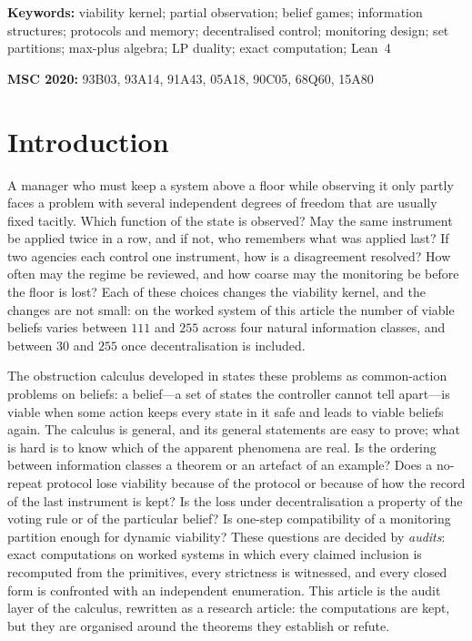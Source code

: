 \documentclass[11pt,a4paper]{article}
\theoremstyle{plain}
\theoremstyle{definition}
\theoremstyle{remark}
\begin{document}
\medskip
\noindent\textbf{Keywords:} viability kernel; partial observation; belief games; information structures; protocols and memory; decentralised control; monitoring design; set partitions; max-plus algebra; LP duality; exact computation; Lean~4

\medskip
\noindent\textbf{MSC 2020:} 93B03, 93A14, 91A43, 05A18, 90C05, 68Q60, 15A80
\section{Introduction}\label{sec:intro}

A manager who must keep a system above a floor while observing it only partly faces a problem with several independent degrees of freedom that are usually fixed tacitly. Which function of the state is observed? May the same instrument be applied twice in a row, and if not, who remembers what was applied last? If two agencies each control one instrument, how is a disagreement resolved? How often may the regime be reviewed, and how coarse may the monitoring be before the floor is lost? Each of these choices changes the viability kernel, and the changes are not small: on the worked system of this article the number of viable beliefs varies between $111$ and $255$ across four natural information classes, and between $30$ and $255$ once decentralisation is included.

The obstruction calculus developed in \cite{Abaee2026calc} states these problems as common-action problems on beliefs: a belief---a set of states the controller cannot tell apart---is viable when some action keeps every state in it safe and leads to viable beliefs again. The calculus is general, and its general statements are easy to prove; what is hard is to know which of the apparent phenomena are real. Is the ordering between information classes a theorem or an artefact of an example? Does a no-repeat protocol lose viability because of the protocol or because of how the record of the last instrument is kept? Is the loss under decentralisation a property of the voting rule or of the particular belief? Is one-step compatibility of a monitoring partition enough for dynamic viability? These questions are decided by \emph{audits}: exact computations on worked systems in which every claimed inclusion is recomputed from the primitives, every strictness is witnessed, and every closed form is confronted with an independent enumeration. This article is the audit layer of the calculus, rewritten as a research article: the computations are kept, but they are organised around the theorems they establish or refute.
\end{document}
